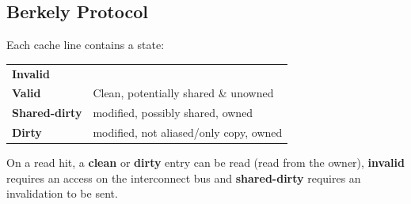 \subsection{Berkely Protocol}
Each cache line contains a state:
\begin{center}
	\begin{tabular}{l p{}}
		\textbf{Invalid}                                               \\
		\textbf{Valid}        & Clean, potentially shared \& unowned   \\
		\textbf{Shared-dirty} & modified, possibly shared, owned       \\
		\textbf{Dirty}        & modified, not aliased/only copy, owned \\
	\end{tabular}
\end{center}

On a read hit, a \textbf{clean} or \textbf{dirty} entry can be read (read from the owner), \textbf{invalid} requires an access on the interconnect bus and \textbf{shared-dirty} requires an invalidation to be sent.


